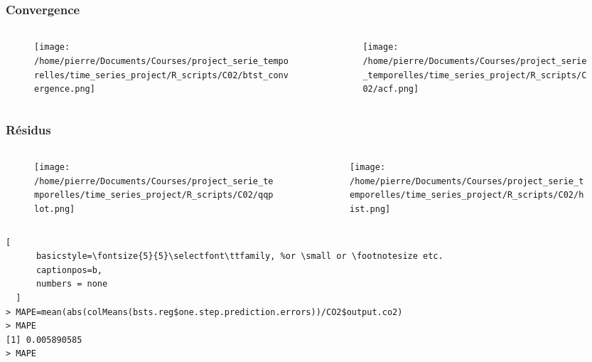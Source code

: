 \documentclass{presentation_template}
\begin{document}
\begin{frame}
  \frametitle{Convergence}
  \begin{columns}
    \begin{column}{0.5\textwidth}
      \begin{figure}
        \texttt{[image: /home/pierre/Documents/Courses/project\_serie\_temporelles/time\_series\_project/R\_scripts/C02/btst\_convergence.png]} 
      \end{figure}
    \end{column}
    \begin{column}{0.5\textwidth}
      \begin{figure}
      \texttt{[image: /home/pierre/Documents/Courses/project\_serie\_temporelles/time\_series\_project/R\_scripts/C02/acf.png]} 
    \end{figure}
      
      
    \end{column}
    \end{columns}
  

\end{frame}

\begin{frame}[fragile]
  \frametitle{Résidus}
  \begin{columns}
    \begin{column}{0.5\textwidth}
      \begin{figure}
    \texttt{[image: /home/pierre/Documents/Courses/project\_serie\_temporelles/time\_series\_project/R\_scripts/C02/qqplot.png]} 
  \end{figure}
    \end{column}
    \begin{column}{0.5\textwidth}
      \begin{figure}
      \texttt{[image: /home/pierre/Documents/Courses/project\_serie\_temporelles/time\_series\_project/R\_scripts/C02/hist.png]} 
    \end{figure}
      
      
    \end{column}
    \end{columns}
  
    \begin{lstlisting}[
      basicstyle=\fontsize{5}{5}\selectfont\ttfamily, %or \small or \footnotesize etc.
      captionpos=b,
      numbers = none
  ]
> MAPE=mean(abs(colMeans(bsts.reg$one.step.prediction.errors))/CO2$output.co2)
> MAPE
[1] 0.005890585
> MAPE
    \end{lstlisting}

\end{frame}
\end{document}
